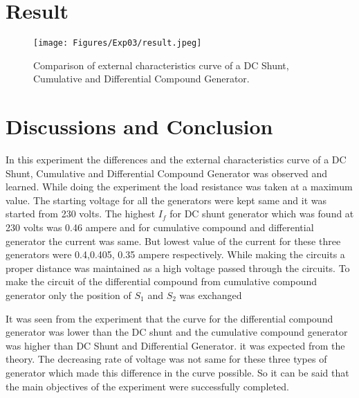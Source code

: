 \FloatBarrier
\newpage
\section{Result} 
\begin{figure}[hbt!]
\vspace{0mm}
    \centerline{\texttt{[image: Figures/Exp03/result.jpeg]}}
    \vspace{0mm}
    \caption{Comparison of external characteristics curve of a DC Shunt, Cumulative and Differential Compound Generator.}
    \label{fig:figg3}
\end{figure}
\vspace{20mm}




\FloatBarrier
\section{Discussions and Conclusion}

In this experiment the differences and the external characteristics curve of a DC Shunt, Cumulative and Differential Compound Generator was observed and learned. While doing the experiment the load resistance was taken at a maximum value. The starting voltage for all the generators were kept same and it was started from 230 volts. The highest $I_f$ for DC shunt generator which was found at 230 volts was 0.46 ampere and for cumulative compound and differential generator the current was same. But lowest value of the current for these three generators were 0.4,0.405, 0.35 ampere respectively. While making the circuits a proper distance was maintained as a high voltage passed through the circuits. To make the circuit of the differential compound from cumulative compound generator only the position of $S_1$ and $S_2$ was exchanged

It was seen from the experiment that the curve for the differential compound generator was lower than the DC shunt and the cumulative compound generator was higher than DC Shunt and Differential Generator. it was expected from the theory. The decreasing rate of voltage was not same for these three types of generator which made this difference in the curve possible. So it can be said that the main objectives of the experiment were successfully completed. 



